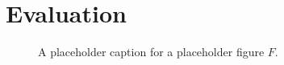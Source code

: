 \section{Evaluation}
\label{sec:eval}

\begin{figure}
  \centerline{}

\caption{A placeholder caption for a placeholder figure \boldmath$F$.}
\label{fig:placeholder}
\end{figure}
